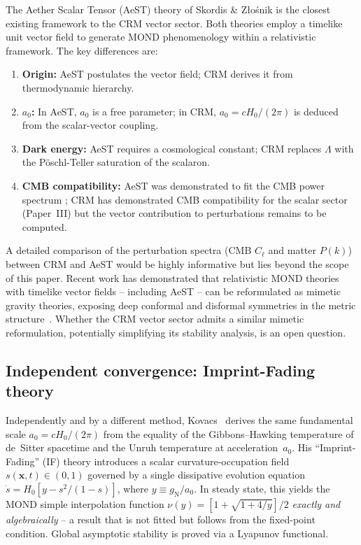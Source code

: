 \documentclass[aps,prd,twocolumn,superscriptaddress,nofootinbib]{revtex4-2}
\begin{document}
The Aether Scalar Tensor (AeST) theory of Skordis \& Z{\l}o\'snik \cite{Skordis2021} is the closest existing framework to the CRM vector sector. Both theories employ a timelike unit vector field to generate MOND phenomenology within a relativistic framework. The key differences are:

\begin{enumerate}
\item \textbf{Origin:} AeST postulates the vector field; CRM derives it from thermodynamic hierarchy.
\item \textbf{$a_0$:} In AeST, $a_0$ is a free parameter; in CRM, $a_0 = cH_0/(2\pi)$ is deduced from the scalar-vector coupling.
\item \textbf{Dark energy:} AeST requires a cosmological constant; CRM replaces $\Lambda$ with the P\"oschl-Teller saturation of the scalaron.
\item \textbf{CMB compatibility:} AeST was demonstrated to fit the CMB power spectrum \cite{Skordis2021}; CRM has demonstrated CMB compatibility for the scalar sector (Paper~III) but the vector contribution to perturbations remains to be computed.
\end{enumerate}

A detailed comparison of the perturbation spectra (CMB $C_\ell$ and matter $P(k)$) between CRM and AeST would be highly informative but lies beyond the scope of this paper. Recent work has demonstrated that relativistic MOND theories with timelike vector fields -- including AeST -- can be reformulated as mimetic gravity theories, exposing deep conformal and disformal symmetries in the metric structure~\cite{DomenechGanz2025}. Whether the CRM vector sector admits a similar mimetic reformulation, potentially simplifying its stability analysis, is an open question.

\subsection{Independent convergence: Imprint-Fading theory}

Independently and by a different method, Kovacs~\cite{Kovacs2026} derives the same fundamental scale $a_0 = cH_0/(2\pi)$ from the equality of the Gibbons--Hawking temperature of de~Sitter spacetime and the Unruh temperature at acceleration~$a_0$. His ``Imprint-Fading'' (IF) theory introduces a scalar curvature-occupation field $s(\mathbf{x},t) \in (0,1)$ governed by a single dissipative evolution equation $\dot{s} = H_0[y - s^2/(1-s)]$, where $y \equiv g_\mathrm{N}/a_0$. In steady state, this yields the MOND simple interpolation function $\nu(y) = [1 + \sqrt{1+4/y}]/2$ \emph{exactly and algebraically} -- a result that is not fitted but follows from the fixed-point condition. Global asymptotic stability is proved via a Lyapunov functional.
\end{document}
